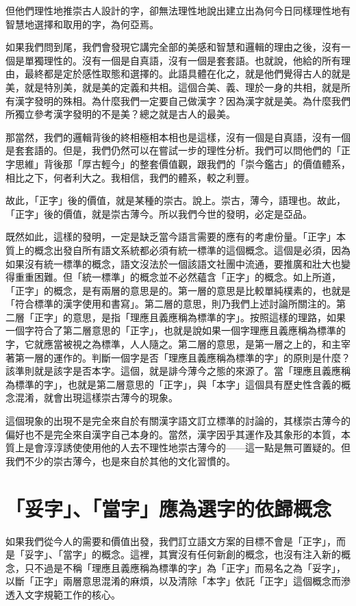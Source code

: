 \documentclass[a5paper, 10pt, openany]{book} %
\begin{document}
但他們理性地推崇古人設計的字，卻無法理性地說出建立出為何今日同樣理性地有智慧地選擇和取用的字，為何亞焉。

如果我們問到尾，我們會發現它講完全部的美感和智慧和邏輯的理由之後，沒有一個是單獨理性的。沒有一個是自真語，沒有一個是套套語。也就說，他給的所有理由，最終都是定於感性取態和選擇的。此語具體在化之，就是他們覺得古人的就是美，就是特別美，就是美的定義和共相。這個合美、義、理於一身的共相，就是所有漢字發明的殊相。為什麼我們一定要自己做漢字？因為漢字就是美。為什麼我們所獨立參考漢字發明的不是美？總之就是古人的最美。 

那當然，我們的邏輯背後的終相極相本相也是這樣，沒有一個是自真語，沒有一個是套套語的。但是，我們仍然可以在嘗試一步的理性分析。我們可以問他們的「正字思維」背後那「厚古輕今」的整套價值觀，跟我們的「崇今鑑古」的價值體系，相比之下，何者利大之。我相信，我們的體系，較之利豐。

故此，「正字」後的價值，就是某種的崇古。說上。崇古，薄今，語理也。故此，「正字」後的價值，就是崇古薄今。所以我們今世的發明，必定是亞品。

既然如此，這樣的發明，一定是缺乏當今語言需要的應有的考慮份量。「正字」本質上的概念出發自所有語文系統都必須有統一標準的這個概念。這個是必須，因為如果沒有統一標準的概念，語文沒法於一個該語文社團中流通，要推廣和壯大也變得重重困難。但「統一標準」的概念並不必然蘊含「正字」的概念。如上所道，「正字」的概念，是有兩層的意思是的。第一層的意思是比較單純樸素的，也就是「符合標準的漢字使用和書寫」。第二層的意思，則乃我們上述討論所關注的。第二層「正字」的意思，是指「理應且義應稱為標準的字」。按照這樣的理路，如果一個字符合了第二層意思的「正字」，也就是說如果一個字理應且義應稱為標準的字，它就應當被視之為標準，人人隨之。第二層的意思，是第一層之上的，和主宰著第一層的運作的。判斷一個字是否「理應且義應稱為標準的字」的原則是什麼？該準則就是該字是否本字。這個，就是誹今薄今之態的來源了。當「理應且義應稱為標準的字」，也就是第二層意思的「正字」，與「本字」這個具有歷史性含義的概念混淆，就會出現這樣崇古薄今的現象。

這個現象的出現不是完全來自於有關漢字語文訂立標準的討論的，其樣崇古薄今的偏好也不是完全來自漢字自己本身的。當然，漢字因乎其運作及其象形的本質，本質上是會淳淳誘使使用他的人去不理性地崇古薄今的——這一點是無可置疑的。但我們不少的崇古薄今，也是來自於其他的文化習慣的。

\section{「妥字」、「當字」應為選字的依歸概念}

如果我們從今人的需要和價值出發，我們訂立語文方案的目標不會是「正字」，而是「妥字」、「當字」的概念。這裡，其實沒有任何新創的概念，也沒有注入新的概念，只不過是不稱「理應且義應稱為標準的字」為「正字」而易名之為「妥字」，以斷「正字」兩層意思混淆的麻煩，以及清除「本字」依託「正字」這個概念而滲透入文字規範工作的核心。
\end{document}
